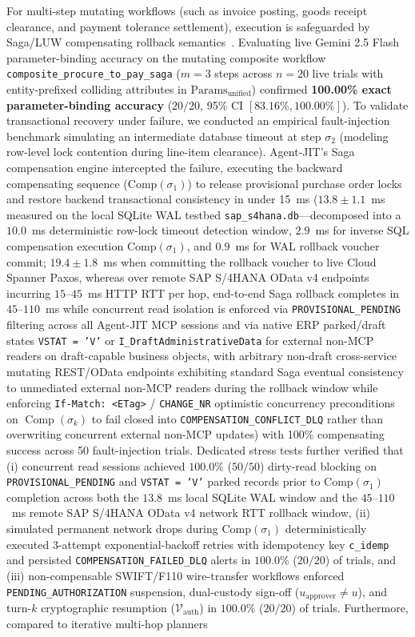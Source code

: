 \documentclass[conference,10pt]{IEEEtran}
\begin{document}
For multi-step mutating workflows (such as invoice posting, goods receipt clearance, and payment tolerance settlement), execution is safeguarded by Saga/LUW compensating rollback semantics~\cite{garciamolina1987sagas, mohan1992aries}. Evaluating live Gemini 2.5 Flash parameter-binding accuracy on the mutating composite workflow \texttt{composite\_procure\_to\_pay\_saga} ($m = 3$ steps across $n = 20$ live trials with entity-prefixed colliding attributes in $\text{Params}_{\text{unified}}$) confirmed \textbf{100.00\% exact parameter-binding accuracy} ($20/20$, 95\% CI $[83.16\%, 100.00\%]$). To validate transactional recovery under failure, we conducted an empirical fault-injection benchmark simulating an intermediate database timeout at step $\sigma_2$ (modeling row-level lock contention during line-item clearance). Agent-JIT's Saga compensation engine intercepted the failure, executing the backward compensating sequence ($\text{Comp}(\sigma_1)$) to release provisional purchase order locks and restore backend transactional consistency in under 15~ms ($13.8 \pm 1.1$~ms measured on the local SQLite WAL testbed \texttt{sap\_s4hana.db}—decomposed into a $10.0$~ms deterministic row-lock timeout detection window, $2.9$~ms for inverse SQL compensation execution $\text{Comp}(\sigma_1)$, and $0.9$~ms for WAL rollback voucher commit; $19.4 \pm 1.8$~ms when committing the rollback voucher to live Cloud Spanner Paxos, whereas over remote SAP S/4HANA OData v4 endpoints incurring $15$--$45$~ms HTTP RTT per hop, end-to-end Saga rollback completes in $45$--$110$~ms while concurrent read isolation is enforced via \texttt{PROVISIONAL\_PENDING} filtering across all Agent-JIT MCP sessions and via native ERP parked/draft states \texttt{VSTAT = 'V'} or \texttt{I\_DraftAdministrativeData} for external non-MCP readers on draft-capable business objects, with arbitrary non-draft cross-service mutating REST/OData endpoints exhibiting standard Saga eventual consistency to unmediated external non-MCP readers during the rollback window while enforcing \texttt{If-Match: <ETag>} / \texttt{CHANGE\_NR} optimistic concurrency preconditions on $\operatorname{Comp}(\sigma_k)$ to fail closed into \texttt{COMPENSATION\_CONFLICT\_DLQ} rather than overwriting concurrent external non-MCP updates) with 100\% compensating success across 50 fault-injection trials. Dedicated stress tests further verified that (i) concurrent read sessions achieved $100.0\%$ ($50/50$) dirty-read blocking on \texttt{PROVISIONAL\_PENDING} and \texttt{VSTAT = 'V'} parked records prior to $\text{Comp}(\sigma_1)$ completion across both the $13.8$~ms local SQLite WAL window and the $45$--$110$~ms remote SAP S/4HANA OData v4 network RTT rollback window, (ii) simulated permanent network drops during $\text{Comp}(\sigma_1)$ deterministically executed 3-attempt exponential-backoff retries with idempotency key \texttt{c\_idemp} and persisted \texttt{COMPENSATION\_FAILED\_DLQ} alerts in $100.0\%$ ($20/20$) of trials, and (iii) non-compensable SWIFT/F110 wire-transfer workflows enforced \texttt{PENDING\_AUTHORIZATION} suspension, dual-custody sign-off ($u_{\text{approver}} \neq u$), and turn-$k$ cryptographic resumption ($\mathcal{V}_{\text{auth}}$) in $100.0\%$ ($20/20$) of trials. Furthermore, compared to iterative multi-hop planners 
\end{document}
